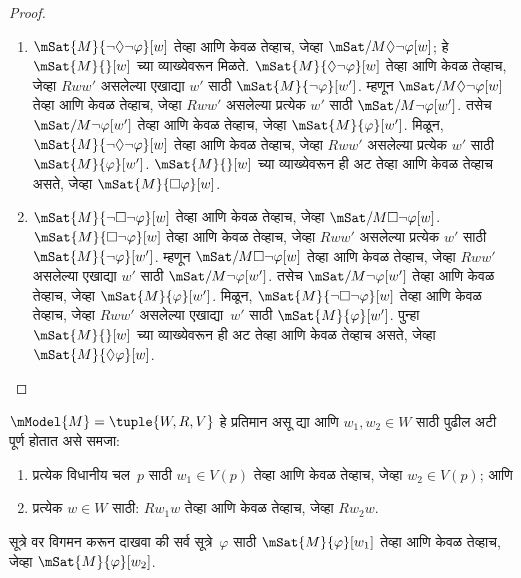 \begin{proof}
  \begin{enumerate}
    \item $\mSat{M}{\lnot\Diamond\lnot \varphi}[w]$ तेव्हा आणि केवळ
      तेव्हाच, जेव्हा $\mSat/{M}{\Diamond\lnot \varphi}[w]$;
      हे $\mSat{M}{}[w]$ च्या व्याख्येवरून मिळते.
      $\mSat{M}{\Diamond\lnot \varphi}[w]$ तेव्हा आणि केवळ तेव्हाच,
      जेव्हा $Rww'$ असलेल्या एखाद्या $w'$ साठी
      $\mSat{M}{\lnot \varphi}[w']$. म्हणून
      $\mSat/{M}{\Diamond\lnot \varphi}[w]$ तेव्हा आणि केवळ तेव्हाच,
      जेव्हा $Rww'$ असलेल्या प्रत्येक $w'$ साठी
      $\mSat/{M}{\lnot \varphi}[w']$. तसेच
      $\mSat/{M}{\lnot \varphi}[w']$ तेव्हा आणि केवळ तेव्हाच,
      जेव्हा $\mSat{M}{\varphi}[w']$. मिळून,
      $\mSat{M}{\lnot\Diamond\lnot \varphi}[w]$ तेव्हा आणि केवळ
      तेव्हाच, जेव्हा $Rww'$ असलेल्या प्रत्येक $w'$ साठी
      $\mSat{M}{\varphi}[w']$. $\mSat{M}{}[w]$ च्या व्याख्येवरून
      ही अट तेव्हा आणि केवळ तेव्हाच असते, जेव्हा
      $\mSat{M}{\Box \varphi}[w]$.
    \item $\mSat{M}{\lnot\Box\lnot \varphi}[w]$
      तेव्हा आणि केवळ तेव्हाच, जेव्हा
      $\mSat/{M}{\Box\lnot \varphi}[w]$.
      $\mSat{M}{\Box\lnot \varphi}[w]$ तेव्हा आणि केवळ तेव्हाच,
      जेव्हा $Rww'$ असलेल्या प्रत्येक $w'$ साठी
      $\mSat{M}{\lnot \varphi}[w']$. म्हणून
      $\mSat/{M}{\Box\lnot \varphi}[w]$ तेव्हा आणि केवळ तेव्हाच,
      जेव्हा $Rww'$ असलेल्या एखाद्या $w'$ साठी
      $\mSat/{M}{\lnot \varphi}[w']$. तसेच
      $\mSat/{M}{\lnot \varphi}[w']$ तेव्हा आणि केवळ तेव्हाच,
      जेव्हा $\mSat{M}{\varphi}[w']$. मिळून,
      $\mSat{M}{\lnot\Box\lnot \varphi}[w]$ तेव्हा आणि केवळ
      तेव्हाच, जेव्हा $Rww'$ असलेल्या एखाद्या~$w'$ साठी
      $\mSat{M}{\varphi}[w']$. पुन्हा $\mSat{M}{}[w]$ च्या
      व्याख्येवरून ही अट तेव्हा आणि केवळ तेव्हाच असते,
      जेव्हा $\mSat{M}{\Diamond \varphi}[w]$.
  \end{enumerate}
\end{proof}




\begin{prob}
  $\mModel{M} = \tuple{W, R, V}$ हे प्रतिमान असू द्या आणि
  $w_1, w_2 \in W$ साठी पुढील अटी पूर्ण होतात असे समजा:
  \begin{enumerate}
  \item प्रत्येक विधानीय चल~$p$ साठी $w_1 \in V(p)$
    तेव्हा आणि केवळ तेव्हाच, जेव्हा $w_2 \in V(p)$; आणि
  \item प्रत्येक $w \in W$ साठी: $Rw_1w$ तेव्हा आणि केवळ
    तेव्हाच, जेव्हा $Rw_2w$.
  \end{enumerate}
  सूत्रे वर विगमन करून दाखवा की सर्व सूत्रे~$\varphi$
  साठी $\mSat{M}{\varphi}[w_1]$ तेव्हा आणि केवळ तेव्हाच,
  जेव्हा $\mSat{M}{\varphi}[w_2]$.
\end{prob}

